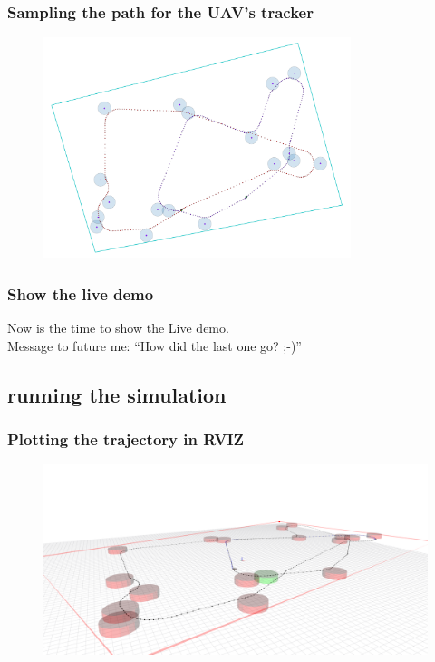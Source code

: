 \documentclass[aspectratio=1610]{beamer}
\begin{document}
  \begin{frame}
    \frametitle{Sampling the path for the UAV's tracker}

    \begin{figure}
      \includegraphics[width=0.8\textwidth]{./fig/tsp_dubins_sampled.png}
    \end{figure}

  \end{frame}

  \begin{frame}
    \frametitle{Show the live demo}

    \begin{center}
      \large Now is the time to show the Live demo.\\
      \vspace{2em}
      Message to future me: ``How did the last one go? ;-)''
    \end{center}

  \end{frame}

  \subsection{running the simulation}


  \begin{frame}
    \frametitle{Plotting the trajectory in RVIZ}

    \begin{figure}
      \includegraphics[width=1.0\textwidth]{./fig/rviz_1.png}
    \end{figure}

  \end{frame}
\end{document}
